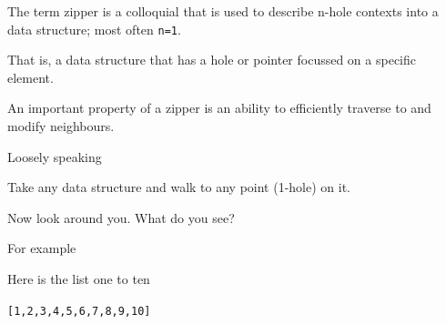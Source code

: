 
\begin{frame}
\begin{center}
The term zipper is a colloquial that is used to describe n-hole contexts into a data structure; most often \lstinline{n=1}.
\end{center}
\end{frame}

\begin{frame}
\begin{center}
That is, a data structure that has a hole or pointer focussed on a specific element.
\end{center}
\end{frame}

\begin{frame}
\begin{center}
An important property of a zipper is an ability to efficiently traverse to and modify neighbours.
\end{center}
\end{frame}

\begin{frame}
\begin{block}{Loosely speaking}
\begin{center}
Take any data structure and walk to any point (1-hole) on it.
\end{center}
\end{block}
\begin{center}
Now look around you. What do you see?
\end{center}
\end{frame}

\begin{frame}
\begin{block}{For example}
\begin{center}
Here is the list one to ten
\end{center}
\end{block}
\begin{center}
\lstinline{[1,2,3,4,5,6,7,8,9,10]}
\end{center}
\end{frame}

